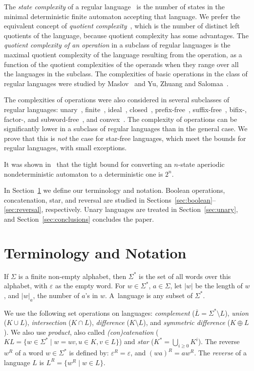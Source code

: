 \documentclass{llncs}
\renewcommand{\ge}{\geqslant}
\newcommand{\ol}{\overline}
\newcommand{\eps}{\varepsilon}
\newcommand{\Sig}{\Sigma}
\begin{document}
The \emph{state complexity} of a regular language~\cite{Yu01} is the number of states in the minimal deterministic finite automaton accepting that language. We prefer  the equivalent concept of \emph{quotient complexity}~\cite{Brz10}, which is the number of distinct left quotients of the language, because quotient complexity has some advantages.
The \emph{quotient complexity of an operation} in a subclass of regular languages is the maximal quotient complexity of the language resulting from the operation, as a function of the quotient complexities of the operands when they range over all the languages in the subclass. 
The complexities of basic operations in the class of regular languages were studied by Maslov~\cite{Mas70} and Yu, Zhuang and Salomaa~\cite{YZS94}.

The complexities of operations were also considered in several subclasses of regular languages: 
unary~\cite{PiSh02,YZS94}, finite~\cite{CCSY01,Yu01}, ideal~\cite{BJL10}, closed~\cite{BJZ10}, prefix-free~\cite{HSW09},  suffix-free~\cite{HaSa09}, bifix-, factor-, and subword-free~\cite{BJS10},   and convex~\cite{Brz10a}. 
The complexity of operations can be significantly lower 
in a subclass of regular languages than in the general case. 
We prove that this is \emph{not} the case for star-free languages, which meet the bounds for regular languages, with  small exceptions.

It was shown in~\cite{BHK09} that the tight bound for converting an $n$-state aperiodic nondeterministic automaton to a deterministic one is $2^n$.

In Section~\ref{sec:terminology} we define our terminology and notation.
Boolean operations, concatenation, star,
and reversal  are studied in Sections~\ref{sec:boolean}--\ref{sec:reversal}, respectively.
Unary languages are treated in Section~\ref{sec:unary}, and
Section~\ref{sec:conclusions} concludes the paper.

\section{Terminology and Notation}
\label{sec:terminology}
If $\Sig$ is a finite non-empty alphabet, then $\Sig^*$ is the set of all  words over this alphabet,
with $\eps$ as the empty word. 
For $w\in\Sig^*$, $a\in\Sig$, let $|w|$ be the length of $w$, and  $|w|_a$, the number of $a$'s in $w$. A~language is any subset of $\Sig^*$.


We use the following set operations on languages:  {\em complement\/} ($\ol{L}=\Sig^*\setminus L$),  {\em union\/}  ($K\cup L$),  {\em intersection\/} ($K\cap L$),  {\em difference\/} ($K\setminus L$), and {\em symmetric difference\/} ($K\oplus L$). 
We also  use \emph{product}, also called  \emph{(con)catenation}  ($KL=\{w\in \Sig^*\mid w=uv, u\in K, v\in L\}$)  and   \emph{star} ($K^*=\bigcup_{i\ge 0}K^i$).
The reverse $w^R$ of a word $w\in\Sig^*$ is defined by: $\eps^R=\eps$, and $(wa)^R=aw^R$.
The \emph{reverse} of a language $L$ is 
$L^R=\{w^R\mid w\in L\}$.
\end{document}
